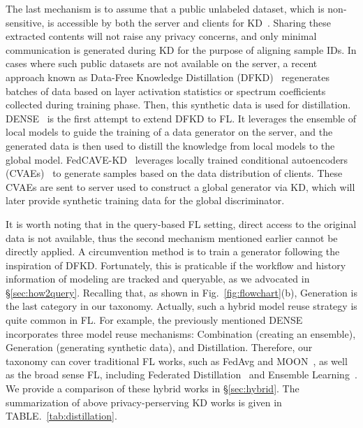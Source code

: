The last mechanism is to assume that a public unlabeled dataset, which is non-sensitive, is accessible by both the server and clients for KD~\cite{li2021practical, li2019fedmd, gong2021ensemble, sun2020federated, huang2022learn, sattler2021fedaux, fang2022robust, gong2022preserving, chang2021cronus, zhang2021parameterized, itahara2021distillation}.
Sharing these extracted contents will not raise any privacy concerns, and only minimal communication is generated during KD for the purpose of aligning sample IDs.
In cases where such public datasets are not available on the server, a recent approach known as Data-Free Knowledge Distillation (DFKD)~\cite{lopes2017data} regenerates batches of data based on layer activation statistics or spectrum coefficients collected during training phase. 
Then, this synthetic data is used for distillation.
DENSE~\cite{zhang2022dense} is the first attempt to extend DFKD to FL. It leverages the ensemble of local models to guide the training of a data generator on the server, and the generated data is then used to distill the knowledge from local models to the global model.
FedCAVE-KD~\cite{heinbaugh2023data} leverages locally trained conditional autoencoders (CVAEs)~\cite{kingma2014auto} to generate samples based on the data distribution of clients. 
These CVAEs are sent to server used to construct a global generator via KD, which will later provide synthetic training data for the global discriminator.

It is worth noting that in the query-based FL setting, direct access to the original data is not available, thus the second mechanism mentioned earlier cannot be directly applied.
A circumvention method is to train a generator following the inspiration of DFKD. 
Fortunately, this is praticable if the workflow and history information of modeling are tracked and queryable, as we advocated in \S\ref{sec:how2query}.
Recalling that, as shown in Fig.~\ref{fig:flowchart}(b), Generation is the last category in our taxonomy.
Actually, such a hybrid model reuse strategy is quite common in FL. 
For example, the previously mentioned DENSE~\cite{zhang2022dense} incorporates three model reuse mechanisms: Combination (creating an ensemble), Generation (generating synthetic data), and Distillation.
Therefore, our taxonomy can cover traditional FL works, such as FedAvg and MOON~\cite{li2021model}, as well as the broad sense FL, including Federated Distillation~\cite{jeong2018communication, jin2023feddyn} and Ensemble Learning~\cite{shi2023fed, wang2023data}.
We provide a comparison of these hybrid works in \S\ref{sec:hybrid}. 
The summarization of above privacy-perserving KD works is given in TABLE.~\ref{tab:distillation}.


